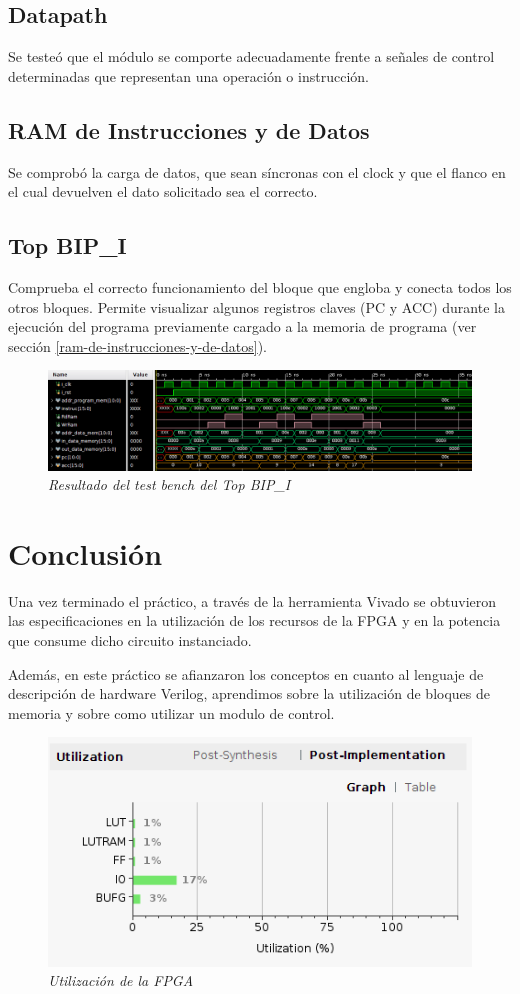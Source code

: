 \documentclass[12pt,A4paper,titlepage]{article}
\begin{document}
\subsection{Datapath}
Se testeó que el módulo se comporte adecuadamente frente a señales de control determinadas que representan una operación o instrucción.

\subsection{RAM de Instrucciones y de Datos}
Se comprobó la carga de datos, que sean síncronas con el clock y que el flanco en el cual devuelven el dato solicitado sea el correcto.

\subsection{Top BIP\_I}
Comprueba el correcto funcionamiento del bloque que engloba y conecta todos los otros bloques. Permite visualizar algunos registros claves (PC y ACC) durante la ejecución del programa previamente cargado a la memoria de programa (ver sección \ref{ram-de-instrucciones-y-de-datos}).
\begin{figure}[h] 
	\centering
	\includegraphics[width=\textwidth]{figure/tb-topBIP.png}
	\caption{\textit{Resultado del test bench del Top BIP\_I}}
    \label{fig:tb-topBI}
\end{figure}


\newpage
\section{Conclusión}
Una vez terminado el práctico, a través de la herramienta Vivado se
obtuvieron las especificaciones en la utilización de los recursos de la FPGA y en la potencia que consume dicho circuito instanciado.

Además, en este práctico se afianzaron los conceptos en cuanto al lenguaje de descripción de hardware Verilog, aprendimos sobre la utilización de bloques de memoria y sobre como utilizar un modulo de control.

\begin{figure}[H] 
	\centering
	\includegraphics[scale=0.7]{figure/utilizacion.png}
	\caption{\textit{Utilización de la FPGA}}
\end{figure}
\end{document}
